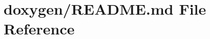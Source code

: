 \hypertarget{doxygen_2README_8md}{}\section{doxygen/\+R\+E\+A\+D\+ME.md File Reference}
\label{doxygen_2README_8md}

